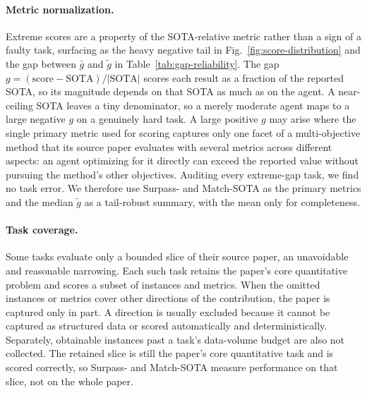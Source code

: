 \documentclass{llmxive}
\begin{document}
\paragraph{Metric normalization.}
Extreme scores are a property of the SOTA-relative metric rather than a sign of a faulty task, surfacing as the heavy negative tail in Fig.~\ref{fig:score-distribution} and the gap between $\bar{g}$ and $\tilde{g}$ in Table~\ref{tab:gap-reliability}. The gap $g=(\text{score}-\text{SOTA})/|\text{SOTA}|$ scores each result as a fraction of the reported SOTA, so its magnitude depends on that SOTA as much as on the agent. A near-ceiling SOTA leaves a tiny denominator, so a merely moderate agent maps to a large negative $g$ on a genuinely hard task. A large positive $g$ may arise where the single primary metric used for scoring captures only one facet of a multi-objective method that its source paper evaluates with several metrics across different aspects: an agent optimizing for it directly can exceed the reported value without pursuing the method's other objectives. Auditing every extreme-gap task, we find no task error. We therefore use Surpass- and Match-SOTA as the primary metrics and the median $\tilde{g}$ as a tail-robust summary, with the mean only for completeness.

\paragraph{Task coverage.}
Some tasks evaluate only a bounded slice of their source paper, an unavoidable and reasonable narrowing. Each such task retains the paper's core quantitative problem and scores a subset of instances and metrics. When the omitted instances or metrics cover other directions of the contribution, the paper is captured only in part. A direction is usually excluded because it cannot be captured as structured data or scored automatically and deterministically. Separately, obtainable instances past a task's data-volume budget are also not collected. The retained slice is still the paper's core quantitative task and is scored correctly, so Surpass- and Match-SOTA measure performance on that slice, not on the whole paper.
\end{document}
